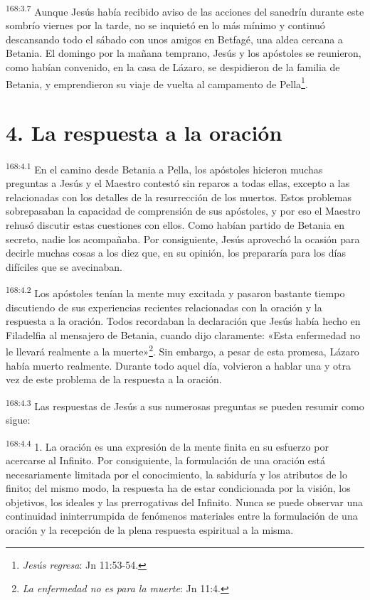 \par 
\textsuperscript{168:3.7} Aunque Jesús había recibido aviso de las acciones del sanedrín durante este sombrío viernes por la tarde, no se inquietó en lo más mínimo y continuó descansando todo el sábado con unos amigos en Betfagé, una aldea cercana a Betania. El domingo por la mañana temprano, Jesús y los apóstoles se reunieron, como habían convenido, en la casa de Lázaro, se despidieron de la familia de Betania, y emprendieron su viaje de vuelta al campamento de Pella\footnote{\textit{Jesús regresa}: Jn 11:53-54.}.

\section*{4. La respuesta a la oración}
\par 
\textsuperscript{168:4.1} En el camino desde Betania a Pella, los apóstoles hicieron muchas preguntas a Jesús y el Maestro contestó sin reparos a todas ellas, excepto a las relacionadas con los detalles de la resurrección de los muertos. Estos problemas sobrepasaban la capacidad de comprensión de sus apóstoles, y por eso el Maestro rehusó discutir estas cuestiones con ellos. Como habían partido de Betania en secreto, nadie los acompañaba. Por consiguiente, Jesús aprovechó la ocasión para decirle muchas cosas a los diez que, en su opinión, los prepararía para los días difíciles que se avecinaban.

\par 
\textsuperscript{168:4.2} Los apóstoles tenían la mente muy excitada y pasaron bastante tiempo discutiendo de sus experiencias recientes relacionadas con la oración y la respuesta a la oración. Todos recordaban la declaración que Jesús había hecho en Filadelfia al mensajero de Betania, cuando dijo claramente: «Esta enfermedad no le llevará realmente a la muerte»\footnote{\textit{La enfermedad no es para la muerte}: Jn 11:4.}. Sin embargo, a pesar de esta promesa, Lázaro había muerto realmente. Durante todo aquel día, volvieron a hablar una y otra vez de este problema de la respuesta a la oración.

\par 
\textsuperscript{168:4.3} Las respuestas de Jesús a sus numerosas preguntas se pueden resumir como sigue:

\par 
\textsuperscript{168:4.4} 1. La oración es una expresión de la mente finita en su esfuerzo por acercarse al Infinito. Por consiguiente, la formulación de una oración está necesariamente limitada por el conocimiento, la sabiduría y los atributos de lo finito; del mismo modo, la respuesta ha de estar condicionada por la visión, los objetivos, los ideales y las prerrogativas del Infinito. Nunca se puede observar una continuidad ininterrumpida de fenómenos materiales entre la formulación de una oración y la recepción de la plena respuesta espiritual a la misma.

